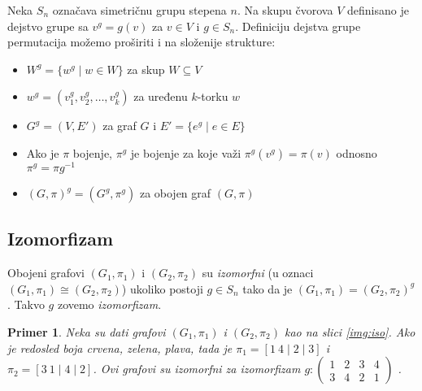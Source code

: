 \documentclass[12pt,oneside]{memoir}
\newtheorem{example}{Primer}
\theoremstyle{definition}
\begin{document}
   Neka $S_n$ označava simetričnu grupu stepena $n$. Na skupu čvorova $V$
   definisano je dejstvo grupe sa $v^g = g(v)$ za $v \in V$ i $g \in S_n$.
   Definiciju dejstva grupe permutacija možemo proširiti i na složenije
   strukture:
   \begin{itemize}
       \item $W^g = \{w^g \mid w \in W\}$ za skup $W \subseteq V$
       \item $w^g = (v_1^g, v_2^g, \dots, v_k^g)$ za uređenu $k$-torku $w$
       \item $G^g = (V, E')$ za graf $G$ i $E' = \{e^g \mid e \in E\}$
       \item Ako je $\pi$ bojenje, $\pi^g$ je bojenje za koje važi
		   $\pi^g(v^g)=\pi(v)$ odnosno $\pi^g=\pi g^{-1}$
       \item $(G, \pi)^g = (G^g, \pi^g)$ za obojen graf $(G, \pi)$
   \end{itemize}


   \subsection{Izomorfizam}

   Obojeni grafovi $(G_1, \pi_1)$ i $(G_2, \pi_2)$ su \emph{izomorfni} (u oznaci
   $(G_1, \pi_1) \cong (G_2, \pi_2)$) ukoliko postoji $g \in S_n$ tako da je
   $(G_1, \pi_1) = (G_2, \pi_2)^g$. Takvo $g$ zovemo \emph{izomorfizam}.

   \begin{example}
	   Neka su dati grafovi $(G_1, \pi_1)$ i $(G_2, \pi_2)$ kao na slici
	   \ref{img:iso}. Ako je redosled boja crvena, zelena, plava, tada je
	   $\pi_1 = [1\ 4\mid 2 \mid 3]$ i $\pi_2 = [3\ 1 \mid 4 \mid 2]$. Ovi
	   grafovi su izomorfni za izomorfizam
	   $g :
	   \begin{pmatrix}
		   1 & 2 & 3 & 4\\
		   3 & 4 & 2 & 1
	   \end{pmatrix}$
	   .
   \end{example}
\end{document}
